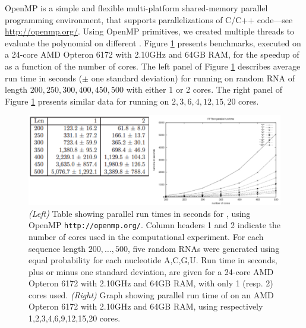 OpenMP is a simple and flexible
multi-platform shared-memory parallel programming environment, that supports
parallelizations of C/C++ code---see \url{http://openmp.org/}.
Using OpenMP primitives, we created multiple threads to evaluate the polynomial
\emZ{} on different \nRoUs. Figure \ref{fig:fftbor:benchmarkingParallel}
presents benchmarks, executed on
a 24-core AMD Opteron 6172 with 2.10GHz and 64GB RAM, for the speedup
of \fftbor as a function of the number of cores.
The left panel of Figure \ref{fig:fftbor:benchmarkingParallel} describes average
run time in seconds ($\pm$ one standard deviation) for running \fftbor
on random RNA of length $200,250,300,400,450,500$ with either 1 or 2 cores.
The right panel of Figure \ref{fig:fftbor:benchmarkingParallel}
presents similar data for running
\fftbor on $2,3,6,4,12,15,20$ cores.

\begin{figure}[!ht]
\centering
\includegraphics[width=.9\textwidth]{Figures/FFTbor/benchmarkingOpenMP.pdf}
\caption{{\em (Left)} Table showing parallel run times in seconds
for \fftbor, using
OpenMP {\tt http://openmp.org/}. Column headers 1 and 2 indicate
the number of cores used in the computational experiment.
For each sequence length $200,\dots,500$,
five random RNAs were generated using equal probability for each nucleotide
A,C,G,U. Run time in seconds, plus or minus one standard deviation, are
given for a 24-core
AMD Opteron 6172 with 2.10GHz and 64GB RAM, with only 1 (resp. 2) cores
used.
{\em (Right)} Graph showing parallel run time of \fftbor on
an AMD Opteron 6172 with 2.10GHz and 64GB RAM, using respectively
1,2,3,4,6,9,12,15,20 cores.
}
\label{fig:fftbor:benchmarkingParallel}
\end{figure}
